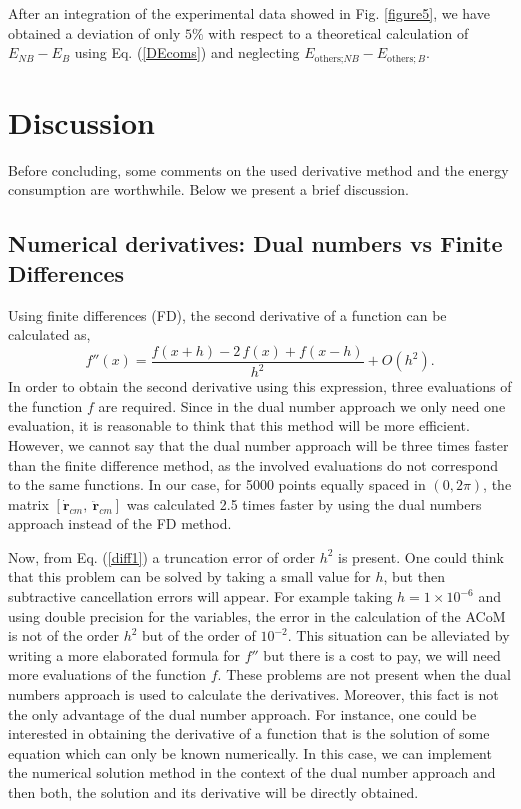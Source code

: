 \documentclass[11pt]{article}
\begin{document}
After an integration of the experimental data showed in Fig. 
\ref{figure5}, we have obtained a deviation of only $5\%$ with respect
to a theoretical calculation of $E_{NB}-E_{B}$ using Eq. (\ref{DEcoms})
and neglecting $E_{\text{others;}NB} -E_{\text{others};B}$.


\section{Discussion}\label{Discussion}
Before concluding, some comments on the used derivative method and the
energy consumption are worthwhile. Below we present a brief discussion.

\subsection*{Numerical derivatives: Dual numbers vs Finite Differences}
Using finite differences (FD), the second derivative of a function can 
be calculated as,
\begin{equation}\label{diff1}
f''(x) = \frac{f(x+h)-2\,f(x)+f(x-h)}{h^2}+O(h^2).
\end{equation}
In order to obtain the second derivative using this expression, three 
evaluations of the function $f$ are required. Since in the dual number 
approach we only need one evaluation, it is reasonable to think  that 
this method will be more efficient. However, we cannot say that the dual 
number approach will be three times faster than the finite difference 
method, as the involved evaluations do not correspond to the same 
functions.  In our case, for 5000 points equally spaced in $(0,2\pi)$, 
the matrix $[ \mathbf{\dot{r}}_{cm},~ \mathbf{\ddot{r}}_{cm}]$ was 
calculated 2.5 times faster by using the dual numbers approach instead 
of the FD method. 

Now, from Eq. (\ref{diff1}) a truncation error of order $h^2$ is 
present. One could think that this problem can be solved by taking a 
small value for $h$, but then subtractive cancellation errors will 
appear. For example taking $h=1\times 10^{-6}$ and using double 
precision for the variables, the error in the calculation of the ACoM is 
not of the order $h^2$ but of the order of $10^{-2}$. This situation can 
be alleviated by writing a more elaborated formula for $f''$ but there 
is a cost to pay, we will need more evaluations of the function $f$. 
These problems are not present when the dual numbers approach is used to 
calculate the derivatives. Moreover, this fact is not the only advantage 
of the dual number approach. For instance, one could be interested in 
obtaining the derivative of a function that is the solution of some 
equation which can only be known numerically. In this case, we can 
implement the numerical solution method in the context of the dual 
number approach and then both, the solution and its derivative will be 
directly obtained.
\end{document}
